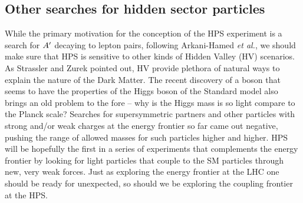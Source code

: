\subsection{Other searches for hidden sector particles}
\label{sec:hidden_ex}

While the primary motivation for the conception of the HPS experiment is a search for $A^\prime$ decaying to lepton pairs, following Arkani-Hamed {\it et al.\/}\cite{ArkaniHamed:2008qn}, we should make sure that HPS is sensitive to other kinds of Hidden Valley (HV) scenarios. As Strassler and Zurek\cite{Strassler:2006im} pointed out, HV provide plethora of natural ways to explain the nature of the Dark Matter. The recent discovery of a boson that seems to have the properties of the Higgs boson of the Standard model also brings an old problem to the fore – why is the Higgs mass is so light compare to the Planck scale? Searches for supersymmetric partners and other particles with strong and/or weak charges at the energy frontier so far came out negative, pushing the range of allowed masses for such particles higher and higher. HPS will be hopefully the first in a series of experiments that complements the energy frontier by looking for light particles that couple to the SM particles through new, very weak forces. Just as exploring the energy frontier at the LHC one should be ready for unexpected, so should we be exploring the coupling frontier at the HPS.


